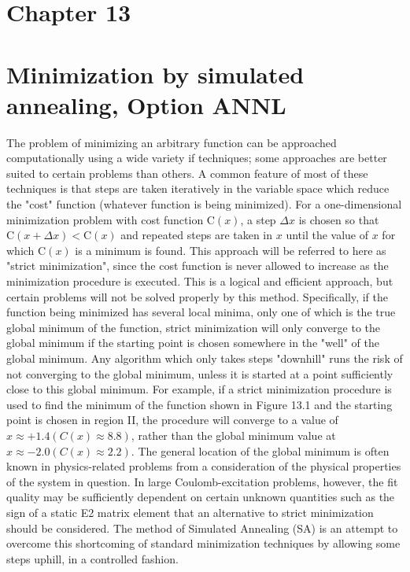 \documentclass[10pt]{article}
\begin{document}
\section*{Chapter 13}
\section*{Minimization by simulated annealing, Option ANNL }
The problem of minimizing an arbitrary function can be approached computationally using a wide variety if techniques; some approaches are better suited to certain problems than others. A common feature of most of these techniques is that steps are taken iteratively in the variable space which reduce the "cost" function (whatever function is being minimized). For a one-dimensional minimization problem with cost function $\mathrm{C}(x)$, a step $\Delta x$ is chosen so that $\mathrm{C}(x+\Delta x)<\mathrm{C}(x)$ and repeated steps are taken in $x$ until the value of $x$ for which $\mathrm{C}(x)$ is a minimum is found. This approach will be referred to here as "strict minimization", since the cost function is never allowed to increase as the minimization procedure is executed. This is a logical and efficient approach, but certain problems will not be solved properly by this method. Specifically, if the function being minimized has several local minima, only one of which is the true global minimum of the function, strict minimization will only converge to the global minimum if the starting point is chosen somewhere in the "well" of the global minimum. Any algorithm which only takes steps "downhill" runs the risk of not converging to the global minimum, unless it is started at a point sufficiently close to this global minimum. For example, if a strict minimization procedure is used to find the minimum of the function shown in Figure 13.1 and the starting point is chosen in region II, the procedure will converge to a value of $x \approx+1.4(C(x) \approx 8.8)$, rather than the global minimum value at $x \approx-2.0(C(x) \approx 2.2)$. The general location of the global minimum is often known in physics-related problems from a consideration of the physical properties of the system in question. In large Coulomb-excitation problems, however, the fit quality may be sufficiently dependent on certain unknown quantities such as the sign of a static E2 matrix element that an alternative to strict minimization should be considered. The method of Simulated Annealing (SA) is an attempt to overcome this shortcoming of standard minimization techniques by allowing some steps uphill, in a controlled fashion.
\end{document}
